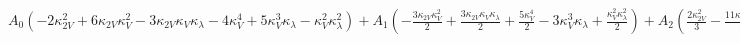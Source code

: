 $
A_{0} \left(- 2 \kappa_{2V}^{2} + 6 \kappa_{2V} \kappa_{V}^{2} - 3 \kappa_{2V} \kappa_{V} \kappa_{\lambda} - 4 \kappa_{V}^{4} + 5 \kappa_{V}^{3} \kappa_{\lambda} - \kappa_{V}^{2} \kappa_{\lambda}^{2}\right) + A_{1} \left(- \frac{3 \kappa_{2V} \kappa_{V}^{2}}{2} + \frac{3 \kappa_{2V} \kappa_{V} \kappa_{\lambda}}{2} + \frac{5 \kappa_{V}^{4}}{2} - 3 \kappa_{V}^{3} \kappa_{\lambda} + \frac{\kappa_{V}^{2} \kappa_{\lambda}^{2}}{2}\right) + A_{2} \left(\frac{2 \kappa_{2V}^{2}}{3} - \frac{11 \kappa_{2V} \kappa_{V}^{2}}{6} + \frac{\kappa_{2V} \kappa_{V} \kappa_{\lambda}}{6} + \frac{7 \kappa_{V}^{4}}{6} - \frac{\kappa_{V}^{3} \kappa_{\lambda}}{6}\right) + A_{3} \left(\frac{4 \kappa_{2V}^{2}}{3} - \frac{8 \kappa_{2V} \kappa_{V}^{2}}{3} + \frac{4 \kappa_{2V} \kappa_{V} \kappa_{\lambda}}{3} + \frac{4 \kappa_{V}^{4}}{3} - \frac{4 \kappa_{V}^{3} \kappa_{\lambda}}{3}\right) + A_{4} \left(- \frac{\kappa_{2V} \kappa_{V}^{2}}{2} + \frac{\kappa_{2V} \kappa_{V} \kappa_{\lambda}}{2} + \frac{\kappa_{V}^{4}}{2} - \kappa_{V}^{3} \kappa_{\lambda} + \frac{\kappa_{V}^{2} \kappa_{\lambda}^{2}}{2}\right) + A_{5} \left(\frac{\kappa_{2V} \kappa_{V}^{2}}{2} - \frac{\kappa_{2V} \kappa_{V} \kappa_{\lambda}}{2} - \frac{\kappa_{V}^{4}}{2} + \frac{\kappa_{V}^{3} \kappa_{\lambda}}{2}\right)
$
